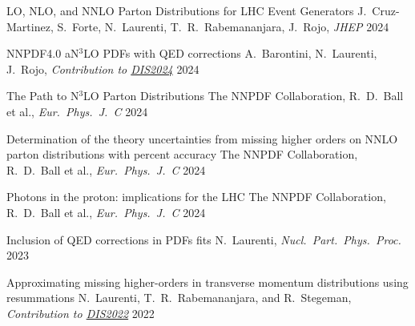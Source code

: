 
\begin{cvhonors}


    \cvhonor
    {LO, NLO, and NNLO Parton Distributions for LHC Event Generators} %
    {J.~Cruz-Martinez, S.~Forte, N.~Laurenti, T.~R.~Rabemananjara, J.~Rojo, \emph{JHEP}} %
    {\vspace{0.35cm}\href{https://inspirehep.net/literature/2800507}{\inspire}}
    {\vspace{0.35cm}2024}

    \cvhonor
    {NNPDF4.0 aN$^3$LO PDFs with QED corrections} %
    {A.~Barontini, N.~Laurenti, J.~Rojo, \emph{Contribution to \href{https://inspirehep.net/conferences/2667502?ui-citation-summary=true}{DIS2024}}} %
    {\href{https://inspirehep.net/literature/2794583}{\inspire}}
    {2024}
    
    \cvhonor
    {The Path to N$^3$LO Parton Distributions} %
    {The NNPDF Collaboration, R.~D.~Ball et al., \emph{Eur.\ Phys.\ J.\ C}} %
    {\href{https://inspirehep.net/literature/2762925}{\inspire}}
    {2024}
    
    \cvhonor
    {Determination of the theory uncertainties from missing higher orders on NNLO parton distributions with percent accuracy} %
    {The NNPDF Collaboration, R.~D.~Ball et al., \emph{Eur.\ Phys.\ J.\ C}} %
    {\vspace{0.35cm}\href{https://inspirehep.net/literature/2749502}{\inspire}}
    {\vspace{0.35cm}2024}
    
    \cvhonor
    {Photons in the proton: implications for the LHC} %
    {The NNPDF Collaboration, R.~D.~Ball et al., \emph{Eur.\ Phys.\ J.\ C}} %
    {\href{https://inspirehep.net/literature/2747770}{\inspire}}
    {2024}

    \cvhonor
    {Inclusion of QED corrections in PDFs ﬁts}
    {N.~Laurenti, \textit{Nucl.\ Part.\ Phys.\ Proc.}}
    {\href{https://inspirehep.net/literature/2780465}{\inspire}}
    {2023}
    
    \cvhonor
    {Approximating missing higher-orders in transverse momentum distributions using resummations}
    {N.~Laurenti, T.~R.~Rabemananjara, and R.~Stegeman, \emph{Contribution to \href{https://inspirehep.net/conferences/1914506?ui-citation-summary=true}{DIS2022}}}
    {\vspace{0.35cm}\href{https://inspirehep.net/literature/2122473}{\inspire}}
    {\vspace{0.35cm}2022}

\end{cvhonors}